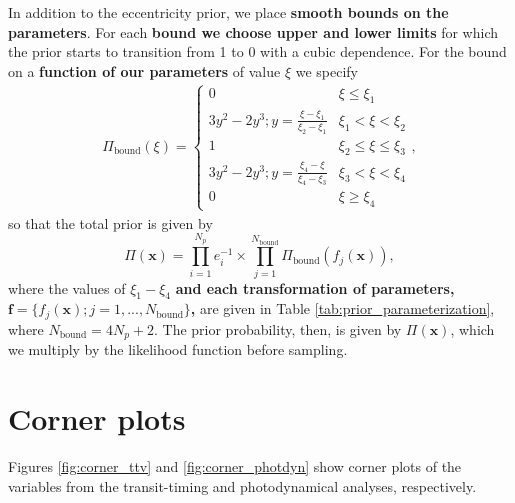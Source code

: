 \documentclass[twocolumn]{aastex63}
\begin{document}
In addition to the eccentricity prior, we place \textbf{smooth bounds on the parameters}.
For each \textbf{bound
we choose upper and lower limits} for which the prior starts to transition from 1 to 0 with a cubic dependence.
For the bound on a \textbf{function of our parameters} of value $\xi$ we specify
\begin{eqnarray}
    \Pi_\mathrm{bound}(\xi) =
    \begin{cases}
        0                                            & \xi {\le} \xi_1             \\
        3y^2-2y^3; y = \frac{\xi-\xi_1}{\xi_2-\xi_1} & \xi_1 {<} \xi {<} \xi_2     \\
        1                                            & \xi_2 {\le} \xi {\le} \xi_3 \\
        3y^2-2y^3; y = \frac{\xi_4-\xi}{\xi_4-\xi_3} & \xi_3{<} \xi {<} \xi_4      \\
        0                                            & \xi {\ge} \xi_4
    \end{cases},
\end{eqnarray}
so that the total prior is given by
\begin{equation}
    \Pi(\mathbf{x}) = \prod_{i=1}^{N_p} e_i^{-1} {\times} \prod_{j=1}^{N_\mathrm{bound}} \Pi_\mathrm{bound}(f_j(\mathbf{x})),
\end{equation}
where the values of $\xi_1{-}\xi_4$ \textbf{and each transformation of
parameters,
$\mathbf{f} {=} \{f_j(\mathbf{x}); j{=} 1,...,N_\mathrm{bound}\}$,} are given in Table
\ref{tab:prior_parameterization}, where $N_\mathrm{bound} = 4 N_p + 2$.
The prior probability, then, is given by $\Pi(\mathbf{x})$, which we
multiply by the likelihood function before sampling.

\section{Corner plots}

Figures \ref{fig:corner_ttv} and \ref{fig:corner_photdyn} 
show corner plots of the variables
from the transit-timing and photodynamical analyses, respectively.
\end{document}
